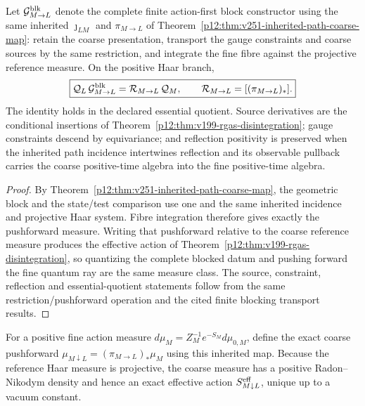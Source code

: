 \documentclass[12pt,a4paper]{article}
\begin{document}
\begin{corollary}
\label{p12:cor:v251-finite-same-owner-block-square}
Let $\mathcal G^{\rm blk}_{M\to L}$ denote the complete finite action-first
block constructor using the same inherited $\jmath_{LM}$ and
$\pi_{M\to L}$ of Theorem~\ref{p12:thm:v251-inherited-path-coarse-map}:
retain the coarse presentation, transport the gauge constraints and coarse
sources by the same restriction, and integrate the fine fibre against the
projective reference measure.  On the positive Haar branch,
\begin{equation}
\label{p12:eq:v251-finite-same-owner-square}
 \boxed{
 \mathcal Q_L\,\mathcal G^{\rm blk}_{M\to L}
 =\mathcal R_{M\to L}\,\mathcal Q_M,
 \qquad
 \mathcal R_{M\to L}=[(\pi_{M\to L})_*].}
\end{equation}
The identity holds in the declared essential quotient.  Source derivatives
are the conditional insertions of
Theorem~\ref{p12:thm:v199-rgas-disintegration}; gauge constraints descend by
equivariance; and reflection positivity is preserved when the inherited path incidence
intertwines reflection and its observable pullback carries the coarse
positive-time algebra into the fine positive-time algebra.
\end{corollary}
\begin{proof}
By Theorem~\ref{p12:thm:v251-inherited-path-coarse-map}, the geometric block
and the state/test comparison use one and the same inherited incidence and
projective Haar system.  Fibre integration therefore gives exactly the
pushforward measure.  Writing that pushforward relative to the coarse
reference measure produces the effective action of
Theorem~\ref{p12:thm:v199-rgas-disintegration}, so quantizing the complete
blocked datum and pushing forward the fine quantum ray are the same measure
class.  The source, constraint, reflection and essential-quotient statements
follow from the same restriction/pushforward operation and the cited finite
blocking transport results.
\end{proof}

For a positive fine action measure
$d\mu_M=Z_M^{-1}e^{-S_M}d\mu_{0,M}$, define the exact coarse pushforward
$\mu_{M\downarrow L}=(\pi_{M\to L})_*\mu_M$ using this inherited map.
Because the reference Haar measure is projective, the coarse measure has a
positive Radon--Nikodym density and hence an exact effective action
$S^{\rm eff}_{M\downarrow L}$, unique up to a vacuum constant.
\end{document}
